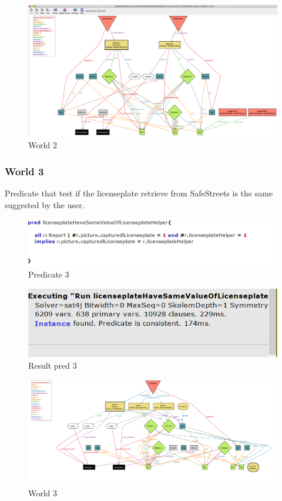 \begin{figure}[h]
	\centering
	\includegraphics[width=1\linewidth, height=0.47\textheight]{Images/Alloy/world2}
	\caption{World 2}
	\label{World2}
\end{figure}
\FloatBarrier
\subsubsection{World 3}
Predicate that test if the licenseplate retrieve from SafeStreets is the same suggested by the user.
\begin{figure}[h]
	\centering
	\includegraphics[width=0.9\linewidth, height=0.15\textheight]{Images/Alloy/predworld31}
	\caption{Predicate 3}
	\label{Pred 3}
\end{figure}

\begin{figure}[h]
	\centering
	\includegraphics[width=0.8\linewidth, height=0.11\textheight]{Images/Alloy/predworld32}
	\caption{Result pred 3}
	\label{Result pred 3}
\end{figure}


\begin{figure}[h]
	\centering
	\includegraphics[width=1.1\linewidth, height=0.55\textheight]{Images/Alloy/world3alloy}
	\caption{World 3}
	\label{World3}
\end{figure}
